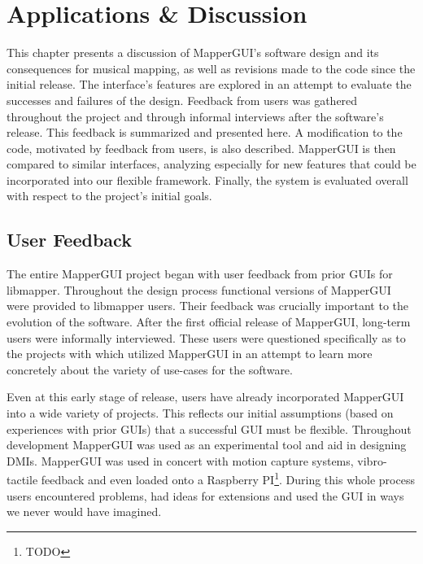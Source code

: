 \chapter{Applications \& Discussion}

This chapter presents a discussion of MapperGUI's software design and its consequences for musical mapping, as well as revisions made to the code since the initial release. The interface's features are explored in an attempt to evaluate the successes and failures of the design. Feedback from users was gathered throughout the project and through informal interviews after the software's release. This feedback is summarized and presented here. A modification to the code, motivated by feedback from users, is also described. MapperGUI is then compared to similar interfaces, analyzing especially for new features that could be incorporated into our flexible framework. Finally, the system is evaluated overall with respect to the project's initial goals.


\section{User Feedback} %
\label{sec:user_feedback}

The entire MapperGUI project began with user feedback from prior GUIs for libmapper. Throughout the design process functional versions of MapperGUI were provided to libmapper users. Their feedback was crucially important to the evolution of the software. After the first official release of MapperGUI, long-term users were informally interviewed. These users were questioned specifically as to the projects with which utilized MapperGUI in an attempt to learn more concretely about the variety of use-cases for the software.

Even at this early stage of release, users have already incorporated MapperGUI into a wide variety of projects. This reflects our initial assumptions (based on experiences with prior GUIs) that a successful GUI must be flexible. Throughout development MapperGUI was used as an experimental tool and aid in designing DMIs. MapperGUI was used in concert with motion capture systems, vibro-tactile feedback and even loaded onto a Raspberry PI\footnote{TODO}. During this whole process users encountered problems, had ideas for extensions and used the GUI in ways we never would have imagined.



